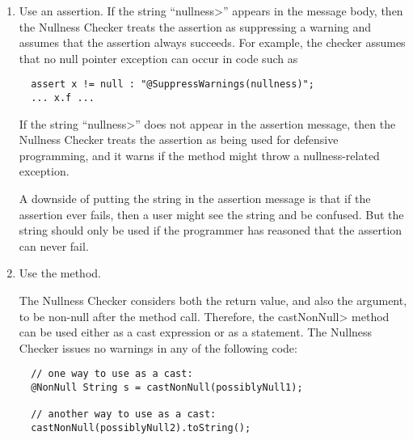\newcommand{\nullnessSuppressionString}{nullness}

\begin{enumerate}
\item
  Use an assertion.  If the string ``\<\nullnessSuppressionString>''
  appears in the message body, then the Nullness Checker treats the
  assertion as suppressing a warning and assumes that the assertion always
  succeeds.  For example, the checker assumes that no null pointer
  exception can occur in code such as
\begin{Verbatim}
  assert x != null : "@SuppressWarnings(nullness)";
  ... x.f ...
\end{Verbatim}

  If the string ``\<\nullnessSuppressionString>'' does not appear in the
  assertion message, then the Nullness Checker treats the assertion as being
  used for defensive programming, and it warns if the method might throw a
  nullness-related exception.

  A downside of putting the string in the assertion message is that if the
  assertion ever fails, then a user might see the string and be confused.
  But the string should only be used if the programmer has reasoned that
  the assertion can never fail.


\item
  Use the  method.

The Nullness
 Checker considers both the return value, and also the argument, to
 be non-null after the method call.  Therefore, the
 \<castNonNull> method can be used either as a cast expression or
 as a statement.  The Nullness Checker issues no warnings in any of
the following code:

\begin{Verbatim}
  // one way to use as a cast:
  @NonNull String s = castNonNull(possiblyNull1);

  // another way to use as a cast:
  castNonNull(possiblyNull2).toString();


\end{Verbatim}
\end{enumerate}
